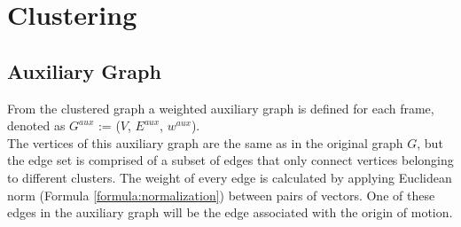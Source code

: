 \chapter{Clustering}

\section{Auxiliary Graph}
From the clustered graph a weighted auxiliary graph is defined for each frame, denoted as $G^{aux}$ := ($V$, $E^{aux}$, $w^{aux}$). \\
The vertices of this auxiliary graph are the same as in the original graph $G$, but the edge set is comprised of a subset of edges that only connect vertices belonging to different clusters.
The weight of every edge is calculated by applying Euclidean norm (Formula \ref{formula:normalization}) between pairs of vectors.
One of these edges in the auxiliary graph will be the edge associated with the origin of motion.
\\

